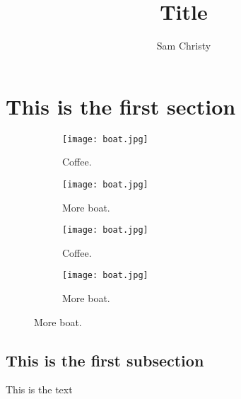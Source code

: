 \documentclass{article}
\title{Title}
\author{Sam Christy}
\begin{document}
\maketitle
\section{This is the first section}

\begin{figure}[h!]
  \centering
  \begin{subfigure}[b]{0.45\linewidth}
    \texttt{[image: boat.jpg]}
     \caption{Coffee.}
  \end{subfigure}
  \begin{subfigure}[b]{0.45\linewidth}
    \texttt{[image: boat.jpg]}
    \caption{More boat.}
  \end{subfigure}

  \begin{subfigure}[b]{0.45\linewidth}
    \texttt{[image: boat.jpg]}
     \caption{Coffee.}
  \end{subfigure}
  \begin{subfigure}[b]{0.45\linewidth}
    \texttt{[image: boat.jpg]}
    \caption{More boat.}
  \end{subfigure}
\end{figure}

\subsection{This is the first subsection}
This is the text
\end{document}
